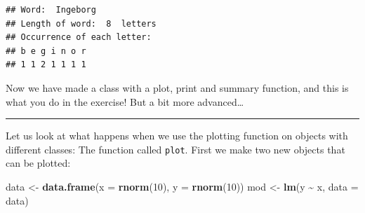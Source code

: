\documentclass[
]{article}
\newenvironment{Shaded}{\begin{snugshade}}{\end{snugshade}}
\newcommand{\AttributeTok}[1]{\textcolor[rgb]{0.13,0.29,0.53}{#1}}
\newcommand{\CommentTok}[1]{\textcolor[rgb]{0.56,0.35,0.01}{\textit{#1}}}
\newcommand{\ControlFlowTok}[1]{\textcolor[rgb]{0.13,0.29,0.53}{\textbf{#1}}}
\newcommand{\DecValTok}[1]{\textcolor[rgb]{0.00,0.00,0.81}{#1}}
\newcommand{\FunctionTok}[1]{\textcolor[rgb]{0.13,0.29,0.53}{\textbf{#1}}}
\newcommand{\NormalTok}[1]{#1}
\newcommand{\OtherTok}[1]{\textcolor[rgb]{0.56,0.35,0.01}{#1}}
\newcommand{\SpecialCharTok}[1]{\textcolor[rgb]{0.81,0.36,0.00}{\textbf{#1}}}
\newcommand{\StringTok}[1]{\textcolor[rgb]{0.31,0.60,0.02}{#1}}
\begin{document}
\begin{Shaded}
\end{Shaded}

\begin{verbatim}
## Word:  Ingeborg 
## Length of word:  8  letters
## Occurrence of each letter:
## b e g i n o r 
## 1 1 2 1 1 1 1
\end{verbatim}

Now we have made a class with a plot, print and summary function, and
this is what you do in the exercise! But a bit more advanced\ldots{}

\begin{center}\rule{0.5\linewidth}{0.5pt}\end{center}

Let us look at what happens when we use the plotting function on objects
with different classes: The function called \texttt{plot}. First we make
two new objects that can be plotted:

\begin{Shaded}
\begin{Highlighting}[]
\NormalTok{data }\OtherTok{\textless{}{-}} \FunctionTok{data.frame}\NormalTok{(}\AttributeTok{x =} \FunctionTok{rnorm}\NormalTok{(}\DecValTok{10}\NormalTok{), }\AttributeTok{y =} \FunctionTok{rnorm}\NormalTok{(}\DecValTok{10}\NormalTok{))}
\NormalTok{mod }\OtherTok{\textless{}{-}} \FunctionTok{lm}\NormalTok{(y }\SpecialCharTok{\textasciitilde{}}\NormalTok{ x, }\AttributeTok{data =}\NormalTok{ data)}
\end{Highlighting}
\end{Shaded}
\end{document}
